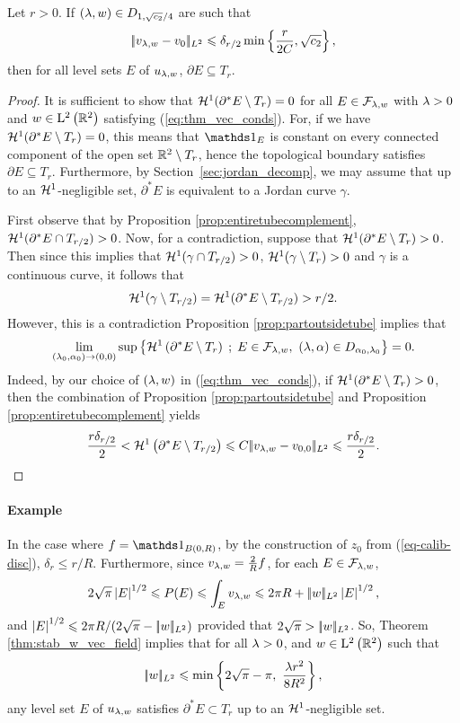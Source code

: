 \begin{thm}\label{thm:stab_w_vec_field}
Let $r>0$.
 If $(\lambda,w)\in D_{1,\sqrt{c_2}/4}$ are such that
  \begin{equation}\label{eq:thm_vec_conds}
  |\!| v_{\lambda,w} - v_0 |\!|_{L^2}\leqslant \delta_{r/2} \min \left\{\frac{r}{2C}, \sqrt{c_2}\right\},
  \end{equation}
  then for all level sets $E$ of $u_{\lambda,w}$, 
$  \partial E \subseteq T_r.
$
\end{thm}


\begin{proof}
  It is sufficient to show that $\mathcal{H}^1(\partial^* E \setminus T_r) = 0$ for all $E\in\mathcal{F}_{\lambda,w}$ with $\lambda>0$ and $w\in \mathrm{L}^2\left(\mathbb{R}^2\right)$ satisfying (\ref{eq:thm_vec_conds}). For, if we have $\mathcal{H}^1(\partial^* E \setminus T_r) = 0$, this means that $\bun{E}$ is constant on every connected component of the open set $\mathbb{R}^2\setminus T_r$, hence the topological boundary satisfies $\partial E\subseteq T_r$.
Furthermore, by Section~\ref{sec:jordan_decomp}, we may assume that  up to an $\mathcal{H}^1$-negligible set, $\partial^* E$ is equivalent to a Jordan curve $\gamma$.

First observe that by Proposition \ref{prop:entiretubecomplement}, $\mathcal{H}^1(\partial^* E\cap T_{r/2})>0$. Now, for a contradiction, suppose that $\mathcal{H}^1(\partial^* E\setminus T_{r})>0$. Then since this implies that $\mathcal{H}^1(\gamma\cap T_{r/2})>0$, $\mathcal{H}^1(\gamma\setminus T_r)>0$ and $\gamma$ is a continuous curve, it follows that $$\mathcal{H}^1(\gamma \setminus T_{r/2}) = \mathcal{H}^1(\partial^* E \setminus T_{r/2})> r/2.$$ However, this is a contradiction Proposition \ref{prop:partoutsidetube} implies that
$$\lim_{(\la_0,\alpha_0)\to (0,0)} \sup \enscond{\HDU{\partial^*\Elaws\setminus T_r}}{\Elaws \in \FFlaw,\ (\la,\alpha)\in \lnr{\alpha_0}{\la_0}}=0.$$
Indeed, by our choice of $(\lambda,w)$ in (\ref{eq:thm_vec_conds}), if $\mathcal{H}^1(\partial^* E\setminus T_r)>0$, then the combination of Proposition  \ref{prop:partoutsidetube} and Proposition \ref{prop:entiretubecomplement} yields
\begin{equation*}
\frac{r\delta_{r/2}}{2} < \mathcal{H}^{1}\left({\partial^*E\setminus T_{r/2}}\right)\leqslant C|\!| v_{\lambda,w}-v_{0,0} |\!|_{L^2} \leqslant \frac{r \delta_{r/2}}{2}.
\end{equation*}

\end{proof}

\paragraph{Example}
In the case where $f = \bun{B(0,R)}$, by  the construction of $z_0$ from  (\ref{eq-calib-disc}), $\delta_r\leq r/R$.
Furthermore, since $v_{\lambda,w} = \frac{2}{R}f$, for each $E\in \mathcal{F}_{\lambda,w}$,
$$
2\sqrt{\pi}\left| E \right|^{1/2}\leqslant P(E) \leqslant \int_E v_{\lambda,w}
\leqslant 2\pi R + |\!| w |\!|_{L^2}\left| E \right|^{1/2},
$$
and $\left| E \right|^{1/2}\leqslant 2\pi R/(2\sqrt{\pi} - |\!| w |\!|_{L^2})$ provided that $2\sqrt{\pi} > |\!| w |\!|_{L^2}$.
 So, Theorem \ref{thm:stab_w_vec_field} implies that for all $\lambda>0$, and $w\in\mathrm{L}^2\left(\mathbb{R}^2\right)$ such that $$|\!| w |\!|_{L^2}\leqslant \min\left\{2\sqrt{\pi}-\pi,~\frac{\lambda  r^2}{8R^2}\right\},$$ any level set $E$ of $u_{\lambda,w}$ satisfies $\partial^* E\subset T_{r}$ up to an $\mathcal{H}^1$-negligible set.

